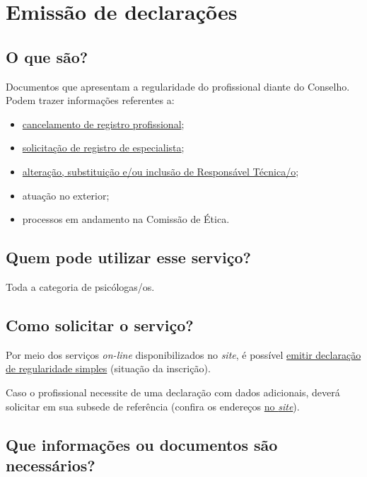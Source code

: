 \chapter{Emissão de declarações}
\label{chap:pf-declaracoes}

\section{O que são?}

Documentos que apresentam a regularidade do profissional diante do Conselho. Podem trazer informações referentes a:

\begin{itemize}
  \item  \hyperref[chap:pf-cancelamento]{cancelamento de  registro profissional};
  \item  \hyperref[chap:pf-especialista]{solicitação  de registro de especialista};
  \item  \hyperref[chap:pj-alteracao]{alteração,  substituição e/ou inclusão de Responsável Técnica/o};
  \item  atuação no exterior;
  \item  processos em andamento na Comissão de Ética.
\end{itemize}
\vfill

\section{Quem pode utilizar esse serviço?}

Toda a categoria de psicólogas/os.
\vfill

\section{Como solicitar o serviço?}

Por meio dos serviços \emph{on-line} disponibilizados no \emph{site}, é possível \href{https://www.crpsp.org/pagina/view/326}{emitir declaração de regularidade simples} (situação da inscrição).

Caso o profissional necessite de uma declaração com dados adicionais, deverá solicitar em sua subsede de referência (confira os endereços \href{https://www.crpsp.org/sede/index}{no \emph{site}}).
\vfill

\section{Que informações ou documentos são necessários?}

